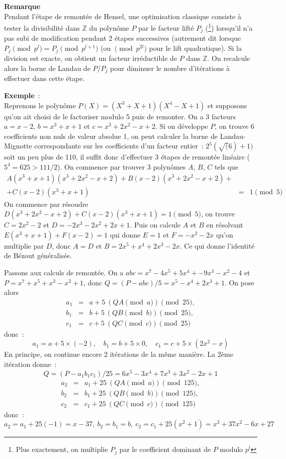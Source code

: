 \documentclass[a4paper,11pt]{book}
\begin{document}
\begin{giacjshere}
{\bf Remarque}\\
Pendant l'étape de remontée de Hensel, une optimisation classique
consiste à tester la divisibilité dans $\mathbb{Z}$ du polynôme $P$ par le 
facteur lifté $P_j$ (\footnote{Plus exactement, on multiplie $P_j$ par le
coefficient dominant de $P$ modulo $p^l$})
lorsqu'il n'a pas subi de modification pendant 2 étapes successives
(autrement dit lorsque $P_j \pmod {p^l}=P_j \pmod {p^{l+1}}$ (ou
$\pmod {p^{2l}}$ pour le lift quadratique). Si la division
est exacte, on obtient un facteur irréductible de $P$ dans $\mathbb{Z}$.
On recalcule alors la borne de Landau de $P/P_j$ pour diminuer
le nombre d'itérations à effectuer dans cette étape.

{\bf Exemple}~:\\ 
Reprenons le polynôme $P(X)=(X^3+X+1)(X^4-X+1)$
et supposons qu'on ait choisi de le factoriser modulo 5 puis 
de remonter. On a 3 facteurs
$a=x-2$, $b=x^3+x+1$ et $c=x^3+2x^2-x+2$. Si on développe $P$, on trouve 6
coefficients non nuls de valeur absolue 1, 
on peut calculer la borne de Landau-Mignotte correspondante
sur les coefficients d'un facteur entier~: $2^{5} (\sqrt(6)+1)$
soit un peu plus de 110, il suffit donc d'effectuer 3 étapes de
remontée linéaire ($5^4=625>111/2$).
On commence par trouver 3 polynômes $A$, $B$, $C$ tels que
\begin{eqnarray*}
A(x^3+x+1)(x^3+2x^2-x+2)+B(x-2)(x^3+2x^2-x+2)+& & \\
+C(x-2)(x^3+x+1)&=&1 \pmod 5
\end{eqnarray*}
On commence par résoudre $D(x^3+2x^2-x+2)+C(x-2)(x^3+x+1)=1\pmod 5$,
on trouve $C=2x^2-2$ et $D=-2x^3-2x^2+2x+1$. Puis on calcule
$A$ et $B$ en résolvant $E(x^3+x+1)+F(x-2)=1$ qui donne $E=1$ et 
$F=-x^2-2x$ qu'on multiplie par $D$, donc $A=D$ et $B=2x^5+x^4+2x^3-2x$.
Ce qui donne l'identité de Bézout généralisée.

Passons aux calculs de remontée. On a $abc=x^7-4x^5+5x^4+-9x^3-x^2-4$
et $P=x^7+x^5+x^3-x^2+1$, donc $Q=(P-abc)/5=x^5-x^4+2x^3+1$. On pose
alors 
\begin{eqnarray*} 
a_1&=&a+5 \ (QA \pmod a)\pmod{25}, \\
b_1&=&b+5 \ (QB \pmod b) \pmod{25}, \\
c_1&=&c+5 \ (QC \pmod c) \pmod{25} 
\end{eqnarray*}
donc~:
\[ a_1= a+5 \times (-2), \quad b_1=b+5 \times 0, 
\quad c_1=c+5 \times (2x^2-x) \]
En principe, on continue encore 2 itérations de la même manière.
La 2ème itération donne~: 
\[ Q=(P-a_1 b_1 c_1)/25= 6x^5-3x^4+7x^3+3x^2-2x+1\] 
\begin{eqnarray*} 
a_2&=&a_1+25 \ (QA \pmod a) \pmod{125}, \\
b_2&=&b_1+25 \ (QB \pmod b) \pmod{125},\\
c_2&=&c_1+25 \ (QC \pmod c) \pmod{125}
\end{eqnarray*}
donc~:
\[ a_2=a_1 +25(-1)=x-37, \ b_2=b_1=b, \ c_2=c_1+25(x^2+1) 
=x^3+37x^2-6x+27 \]


\end{giacjshere}
\end{document}
